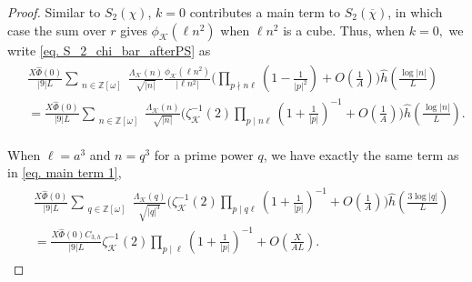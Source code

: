 \documentclass[11pt]{amsart}
\numberwithin{equation}{section}
\theoremstyle{remark}
\begin{document}
\begin{proof}
    Similar to $S_2(\chi)$, $k=0$ contributes a main term to $S_2(\overline{\chi})$, in which case the sum over $r$ gives $\phi_\mathcal{K}(\ell n^2)$ when $\ell n^2$ is a cube. Thus, when $k=0,$ we write \eqref{eq. S_2_chi_bar_afterPS} as
\begin{align}\label{eq. S_2_chi_bar after Euler product}
\begin{split}
    &\frac{X\widehat{\Phi}(0)}{|9|L}
	\sum_{\substack{n\in \mathbb{Z}[\omega]}}
 \frac{\Lambda_\mathcal{K}(n)}{\sqrt{|n|}}  
 \frac{\phi_\mathcal{K}(\ell n^2)}{|\ell n^2|} 
\bigg(\prod_{p \nmid n\ell} \left(1-\frac{1 }{|p|^2}\right) +O\left(\frac{1}{A}\right)\bigg)
	\hat{h}\left(\frac{\log |n|}{L}\right) 
    \\
    &=
    \frac{X\widehat{\Phi}(0)}{|9|L}
	\sum_{\substack{n\in \mathbb{Z}[\omega]}}
 \frac{\Lambda_\mathcal{K}(n)}{\sqrt{|n|}}  
 \bigg(\zeta^{-1}_\mathcal{K}(2)  \prod_{p\mid n\ell}\left(1+\frac{1}{|p|}\right)^{-1} +O\left(\frac{1}{A}\right)\bigg)
	\hat{h}\left(\frac{\log |n|}{L}\right).
    \end{split}
\end{align}

When $\ell=a^3$ and $n=q^3$ for a prime power $q$,
we have exactly the same term as in \eqref{eq. main term 1}, 
\begin{align}
\label{eq. chi_bar main term 1}
   \begin{split}
    &\frac{X\widehat{\Phi}(0)}{|9|L}
	\sum_{\substack{q\in \mathbb{Z}[\omega] }}
 \frac{\Lambda_\mathcal{K}(q)}{\sqrt{|q|^3}}  
 \bigg(\zeta^{-1}_\mathcal{K}(2)  \prod_{p\mid q\ell}\left(1+\frac{1}{|p|}\right)^{-1} +O\left(\frac{1}{A}\right)\bigg)
	\hat{h}\left(\frac{3\log |q|}{L}\right)
    \\
    &=
    \frac{X\widehat{\Phi}(0)C_{3, h}}{|9|L}
    \zeta^{-1}_\mathcal{K}(2)  \prod_{p\mid \ell}\left(1+\frac{1}{|p|}\right)^{-1}
	+ O\left(\frac{X}{AL}\right).  
    \end{split}
\end{align}


\end{proof}
\end{document}
